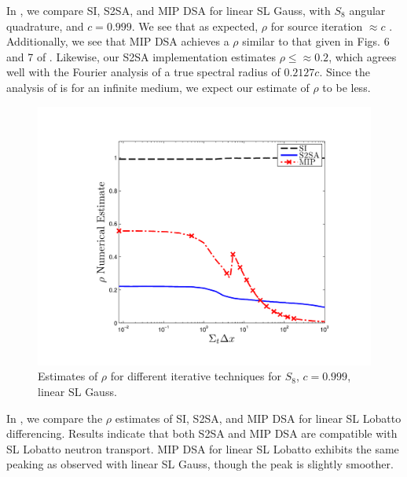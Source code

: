 In , we compare SI, S2SA, and MIP DSA for linear SL Gauss, with $S_8$ angular quadrature, and $c=0.999$.
We see that as expected, $\rho$ for source iteration $\approx c$  \cite{larsen_dsa}.  
Additionally, we see that MIP DSA achieves a $\rho$ similar to that given in Figs. 6 and 7 of \cite{mip_dsa}.
Likewise, our S2SA implementation estimates $\rho \leq \approx 0.2$, which agrees well with the Fourier analysis of \cite{s2sa} a true spectral radius of $0.2127c$.  Since the analysis of \cite{s2sa} is for an infinite medium, we expect our estimate of $\rho$ to be less.
\begin{figure}[!htp]
\centering
\includegraphics[width=12cm]{chapter4_acceleration/Const_2_P1_Gauss_Solvers.pdf}
\caption{Estimates of $\rho$ for different iterative techniques for $S_8$, $c=0.999$, linear SL Gauss.}
\label{fig:p1_gauss}
\end{figure}
In , we compare the $\rho$ estimates of SI, S2SA, and MIP DSA for linear SL Lobatto differencing.  
Results indicate that both S2SA and MIP DSA are compatible with SL Lobatto neutron transport.
MIP DSA for linear SL Lobatto exhibits the same peaking as observed with linear SL Gauss, though the peak is slightly smoother. 
